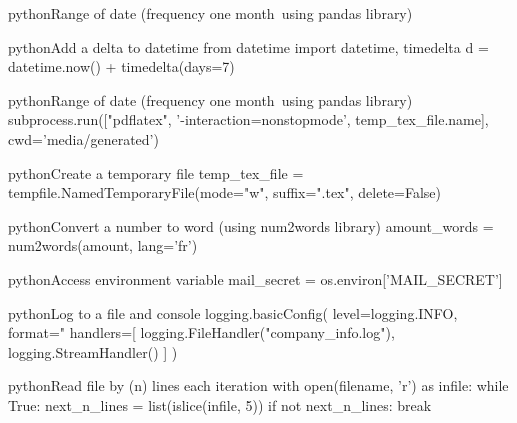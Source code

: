 \documentclass[10pt,a4paper]{article}
\begin{document}
\begin{multicols}{3}
\begin{codebox}{python}{Range of date (frequency one month\, using pandas library)}
\end{codebox}

\begin{codebox}{python}{Add a delta to datetime}
from datetime import datetime, timedelta
d = datetime.now() + timedelta(days=7)

\end{codebox}

\begin{codebox}{python}{Range of date (frequency one month\, using pandas library)}
subprocess.run(["pdflatex", '-interaction=nonstopmode', temp_tex_file.name],
                       cwd='media/generated')

\end{codebox}

\begin{codebox}{python}{Create a temporary file}
temp_tex_file = tempfile.NamedTemporaryFile(mode="w", suffix=".tex", delete=False)

\end{codebox}

\begin{codebox}{python}{Convert a number to word (using num2words library)}
amount_words = num2words(amount, lang='fr')

\end{codebox}

\begin{codebox}{python}{Access environment variable}
mail_secret = os.environ['MAIL_SECRET']

\end{codebox}

\begin{codebox}{python}{Log to a file and console}
logging.basicConfig(
    level=logging.INFO,
    format="%
    handlers=[
        logging.FileHandler("company_info.log"),
        logging.StreamHandler()
    ]
)

\end{codebox}

\begin{codebox}{python}{Read file by (n) lines each iteration}
  with open(filename, 'r') as infile:
    while True:
      next_n_lines = list(islice(infile, 5))
      if not next_n_lines:
          break

\end{codebox}


\AtNextBibliography{\footnotesize}
\printbibliography  
\end{multicols}
\end{document}
